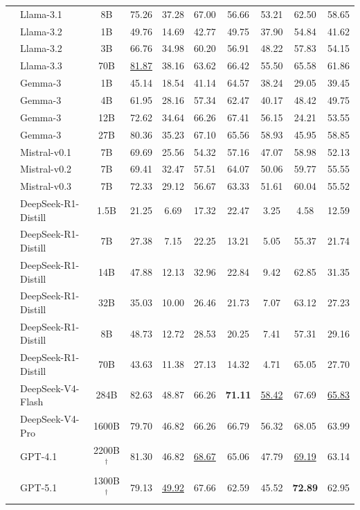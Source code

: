 \documentclass[11pt]{article}
\begin{document}
\begin{table}[t]
{\begin{tabular}{l|l|c|cccccc|c}
& Llama-3.1 & 8B & 75.26 & 37.28 & 67.00 & 56.66 & 53.21 & 62.50 & 58.65 \\
& Llama-3.2 & 1B & 49.76 & 14.69 & 42.77 & 49.75 & 37.90 & 54.84 & 41.62 \\
& Llama-3.2 & 3B & 66.76 & 34.98 & 60.20 & 56.91 & 48.22 & 57.83 & 54.15 \\
& Llama-3.3 & 70B & \underline{81.87} & 38.16 & 63.62 & 66.42 & 55.50 & 65.58 & 61.86 \\

& Gemma-3 & 1B & 45.14 & 18.54 & 41.14 & 64.57 & 38.24 & 29.05 & 39.45 \\
& Gemma-3 & 4B & 61.95 & 28.16 & 57.34 & 62.47 & 40.17 & 48.42 & 49.75 \\
& Gemma-3 & 12B & 72.62 & 34.64 & 66.26 & 67.41 & 56.15 & 24.21 & 53.55 \\
& Gemma-3 & 27B & 80.36 & 35.23 & 67.10 & 65.56 & 58.93 & 45.95 & 58.85 \\

& Mistral-v0.1 & 7B & 69.69 & 25.56 & 54.32 & 57.16 & 47.07 & 58.98 & 52.13 \\
& Mistral-v0.2 & 7B & 69.41 & 32.47 & 57.51 & 64.07 & 50.06 & 59.77 & 55.55 \\
& Mistral-v0.3 & 7B & 72.33 & 29.12 & 56.67 & 63.33 & 51.61 & 60.04 & 55.52 \\

& DeepSeek-R1-Distill & 1.5B & 21.25 & 6.69 & 17.32 & 22.47 & 3.25 & 4.58 & 12.59 \\
& DeepSeek-R1-Distill & 7B & 27.38 & 7.15 & 22.25 & 13.21 & 5.05 & 55.37 & 21.74 \\
& DeepSeek-R1-Distill & 14B & 47.88 & 12.13 & 32.96 & 22.84 & 9.42 & 62.85 & 31.35 \\
& DeepSeek-R1-Distill & 32B & 35.03 & 10.00 & 26.46 & 21.73 & 7.07 & 63.12 & 27.23 \\
& DeepSeek-R1-Distill & 8B & 48.73 & 12.72 & 28.53 & 20.25 & 7.41 & 57.31 & 29.16 \\
& DeepSeek-R1-Distill & 70B & 43.63 & 11.38 & 27.13 & 14.32 & 4.71 & 65.05 & 27.70 \\
\hline

& DeepSeek-V4-Flash & 284B & 82.63 & 48.87 & 66.26 & \textbf{71.11} & \underline{58.42} & 67.69 & \underline{65.83} \\
& DeepSeek-V4-Pro & 1600B & 79.70 & 46.82 & 66.26 & 66.79 & 56.32 & 68.05 & 63.99 \\
& GPT-4.1 & 2200B$^{\dagger}$ & 81.30 & 46.82 & \underline{68.67} & 65.06 & 47.79 & \underline{69.19} & 63.14 \\
& GPT-5.1 & 1300B$^{\dagger}$ & 79.13 & \underline{49.92} & 67.66 & 62.59 & 45.52 & \textbf{72.89} & 62.95 \\
\hline


\end{tabular}}
\end{table}
\end{document}
